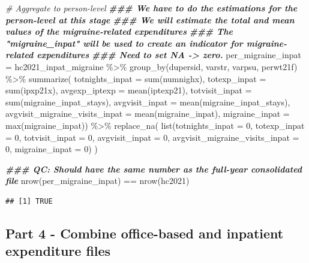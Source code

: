 \documentclass[
]{book}
\newenvironment{Shaded}{\begin{snugshade}}{\end{snugshade}}
\newcommand{\AttributeTok}[1]{\textcolor[rgb]{0.77,0.63,0.00}{#1}}
\newcommand{\CommentTok}[1]{\textcolor[rgb]{0.56,0.35,0.01}{\textit{#1}}}
\newcommand{\DecValTok}[1]{\textcolor[rgb]{0.00,0.00,0.81}{#1}}
\newcommand{\DocumentationTok}[1]{\textcolor[rgb]{0.56,0.35,0.01}{\textbf{\textit{#1}}}}
\newcommand{\FunctionTok}[1]{\textcolor[rgb]{0.00,0.00,0.00}{#1}}
\newcommand{\NormalTok}[1]{#1}
\newcommand{\OtherTok}[1]{\textcolor[rgb]{0.56,0.35,0.01}{#1}}
\newcommand{\SpecialCharTok}[1]{\textcolor[rgb]{0.00,0.00,0.00}{#1}}
\begin{document}
\begin{Shaded}
\begin{Highlighting}[]
\CommentTok{\# Aggregate to person{-}level}
\DocumentationTok{\#\#\# We have to do the estimations for the person{-}level at this stage}
\DocumentationTok{\#\#\# We will estimate the total and mean values of the migraine{-}related expenditures}
\DocumentationTok{\#\#\# The "migraine\_inpat" will be used to create an indicator for migraine{-}related expenditures}
\DocumentationTok{\#\#\# Need to set NA {-}\textgreater{} zero.}
\NormalTok{per\_migraine\_inpat }\OtherTok{=}\NormalTok{ hc2021\_inpat\_migraine }\SpecialCharTok{\%\textgreater{}\%}
  \FunctionTok{group\_by}\NormalTok{(dupersid, varstr, varpsu, perwt21f) }\SpecialCharTok{\%\textgreater{}\%}
  \FunctionTok{summarize}\NormalTok{(}
    \AttributeTok{totnights\_inpat                =} \FunctionTok{sum}\NormalTok{(numnighx),}
    \AttributeTok{totexp\_inpat                   =} \FunctionTok{sum}\NormalTok{(ipxp21x),}
    \AttributeTok{avgexp\_iptexp                  =} \FunctionTok{mean}\NormalTok{(iptexp21),}
    \AttributeTok{totvisit\_inpat                 =} \FunctionTok{sum}\NormalTok{(migraine\_inpat\_stays),}
    \AttributeTok{avgvisit\_inpat                 =} \FunctionTok{mean}\NormalTok{(migraine\_inpat\_stays),}
    \AttributeTok{avgvisit\_migraine\_visits\_inpat =} \FunctionTok{mean}\NormalTok{(migraine\_inpat),}
    \AttributeTok{migraine\_inpat                 =} \FunctionTok{max}\NormalTok{(migraine\_inpat)) }\SpecialCharTok{\%\textgreater{}\%}
  \FunctionTok{replace\_na}\NormalTok{(}
    \FunctionTok{list}\NormalTok{(}\AttributeTok{totnights\_inpat =} \DecValTok{0}\NormalTok{, }\AttributeTok{totexp\_inpat =} \DecValTok{0}\NormalTok{, }\AttributeTok{totvisit\_inpat =} \DecValTok{0}\NormalTok{, }\AttributeTok{avgvisit\_inpat =} \DecValTok{0}\NormalTok{, }\AttributeTok{avgvisit\_migraine\_visits\_inpat =} \DecValTok{0}\NormalTok{, }\AttributeTok{migraine\_inpat =} \DecValTok{0}\NormalTok{)}
\NormalTok{  )}

\DocumentationTok{\#\#\# QC: Should have the same number as the full{-}year consolidated file}
\FunctionTok{nrow}\NormalTok{(per\_migraine\_inpat) }\SpecialCharTok{==} \FunctionTok{nrow}\NormalTok{(hc2021)}
\end{Highlighting}
\end{Shaded}

\begin{verbatim}
## [1] TRUE
\end{verbatim}

\hypertarget{part-4---combine-office-based-and-inpatient-expenditure-files}{%
\subsection{Part 4 - Combine office-based and inpatient expenditure files}\label{part-4---combine-office-based-and-inpatient-expenditure-files}}
\end{document}

